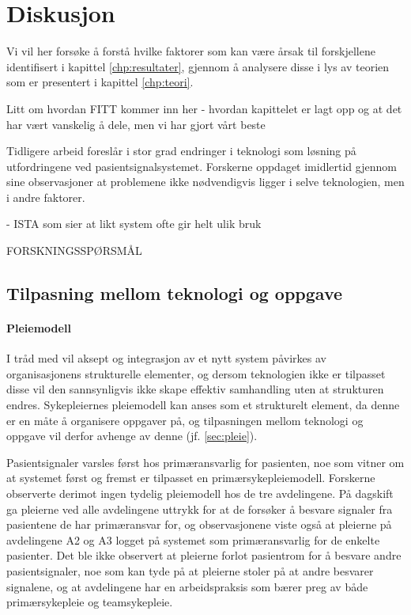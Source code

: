 \chapter{Diskusjon}
\label{chp:diskusjon}

Vi vil her forsøke å forstå hvilke faktorer som kan være årsak til forskjellene identifisert i kapittel \ref{chp:resultater}, gjennom å analysere disse i lys av teorien som er presentert i kapittel \ref{chp:teori}. 

Litt om hvordan FITT kommer inn her - hvordan kapittelet er lagt opp og at det har vært vanskelig å dele, men vi har gjort vårt beste

\noindent
Tidligere arbeid foreslår i stor grad endringer i teknologi som løsning på utfordringene ved pasientsignalsystemet. Forskerne oppdaget imidlertid gjennom sine observasjoner at problemene ikke nødvendigvis ligger i selve teknologien, men i andre faktorer. 

- ISTA som sier at likt system ofte gir helt ulik bruk

FORSKNINGSSPØRSMÅL

\section{Tilpasning mellom teknologi og oppgave}	

\subsubsection{Pleiemodell}	
I tråd med \citet{Orlikowski92} vil aksept og integrasjon av et nytt system påvirkes av organisasjonens strukturelle elementer, og dersom teknologien ikke er tilpasset disse vil den sannsynligvis ikke skape effektiv samhandling uten at strukturen endres. Sykepleiernes pleiemodell kan anses som et strukturelt element, da denne er en måte å organisere oppgaver på, og tilpasningen mellom teknologi og oppgave vil derfor avhenge av denne (jf. \ref{sec:pleie}).

\noindent
Pasientsignaler varsles først hos primæransvarlig for pasienten, noe som vitner om at systemet først og fremst er tilpasset en primærsykepleiemodell. Forskerne observerte derimot ingen tydelig pleiemodell hos de tre avdelingene. På dagskift ga pleierne ved alle avdelingene uttrykk for at de forsøker å besvare signaler fra pasientene de har primæransvar for, og observasjonene viste også at pleierne på avdelingene A2 og A3 logget på systemet som primæransvarlig for de enkelte pasienter. Det ble ikke observert at pleierne forlot pasientrom for å besvare andre pasientsignaler, noe som kan tyde på at pleierne stoler på at andre besvarer signalene, og at avdelingene har en arbeidspraksis som bærer preg av både primærsykepleie og teamsykepleie.

